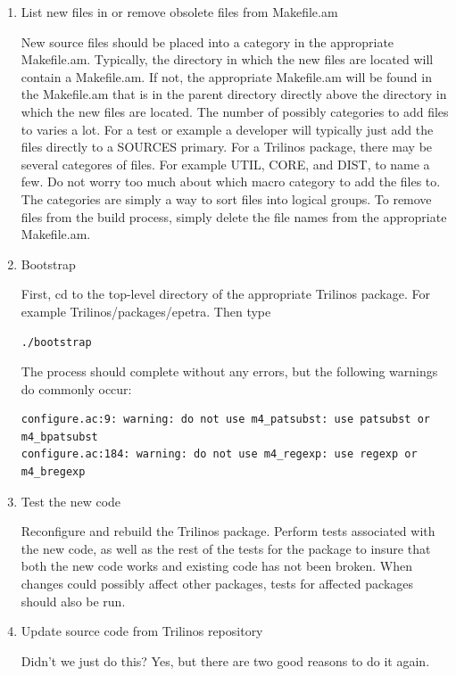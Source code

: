 \documentclass[12pt,relax]{TrilinosDevGuide}
\begin{document}
\begin{enumerate}
\item List new files in or remove obsolete files from Makefile.am

New source files should be placed into a category in the appropriate 
Makefile.am.  Typically, the directory in which the new files are located will 
contain a Makefile.am.  If not, the appropriate Makefile.am will be found in 
the Makefile.am that is in the parent directory directly above the directory 
in which the new files are located.  The number of possibly categories to add 
files to varies a lot.  For a test or example a developer will typically just 
add the files directly to a SOURCES primary.  For a Trilinos package, there 
may be several categores of files.  For example UTIL, CORE, and DIST, to name 
a few.  Do not worry too much about which macro category to add the files to.  
The categories are simply a way to sort files into logical groups.  To remove 
files from the build process, simply delete the file names from the 
appropriate Makefile.am.

\item Bootstrap

First, cd to the top-level directory of the appropriate Trilinos package.  
For example Trilinos/packages/epetra.  Then type 
\begin{verbatim}
./bootstrap
\end{verbatim}
The process should complete without any errors, but the following warnings do 
commonly occur:
\begin{verbatim}
configure.ac:9: warning: do not use m4_patsubst: use patsubst or m4_bpatsubst
configure.ac:184: warning: do not use m4_regexp: use regexp or m4_bregexp
\end{verbatim}

\item Test the new code

Reconfigure and rebuild the Trilinos package.  Perform tests associated with 
the new code, as well as the rest of the tests for the package to insure that 
both the new code works and existing code has not been broken.  When changes 
could possibly affect other packages, tests for affected packages should also 
be run.

\item Update source code from Trilinos repository

Didn't we just do this?  Yes, but there are two good reasons to do it again.


\end{enumerate}
\end{document}

